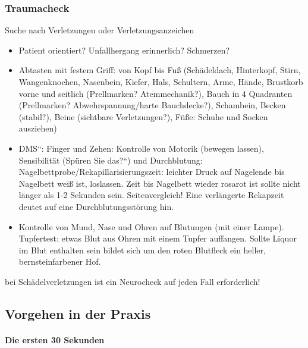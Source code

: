 \subsubsection{Traumacheck}\label{topic:traumacheck}
Suche nach Verletzungen oder Verletzungsanzeichen

\begin{itemize}
\item Patient orientiert? Unfallhergang erinnerlich? Schmerzen?

\end{itemize}
\begin{itemize}
\item Abtasten mit festem Griff: von Kopf bis Fuß (Sch\"adeldach,
Hinterkopf, Stirn, Wangenknochen, Nasenbein, Kiefer, Hals, Schultern,
Arme, H\"ande, Brustkorb vorne und seitlich (Prellmarken?
Atemmechanik?), Bauch in 4 Quadranten (Prellmarken?
Abwehrspannung/harte Bauchdecke?), Schambein, Becken (stabil?), Beine
(sichtbare Verletzungen?), Füße: Schuhe und Socken ausziehen)

\item {\quotedblbase}DMS{\textquotedblleft}: Finger und Zehen: Kontrolle
von Motorik (bewegen lassen), Sensibilit\"at ({\quotedblbase}Spüren
Sie das?{\textquotedblleft}) und Durchblutung:
Nagelbettprobe/Rekapillarisierungszeit: leichter Druck auf Nagelende
bis Nagelbett weiß ist, loslassen. Zeit bis Nagelbett wieder
rosarot ist sollte nicht l\"anger als 1-2 Sekunden sein.
Seitenvergleich! Eine verl\"angerte Rekapzeit deutet auf eine
Durchblutungsstörung hin.

\item Kontrolle von Mund, Nase und Ohren auf Blutungen (mit einer
Lampe). Tupfertest: etwas Blut aus Ohren mit einem Tupfer auffangen.
Sollte Liquor im Blut enthalten sein bildet sich um den roten Blutfleck
ein heller, bernsteinfarbener Hof.

\end{itemize}
bei Sch\"adelverletzungen ist ein Neurocheck auf jeden Fall
erforderlich!

\clearpage
\subsection{Vorgehen in der Praxis}

\paragraph[Die ersten \ \ 30 Sekunden ]{Die ersten  30 Sekunden }

